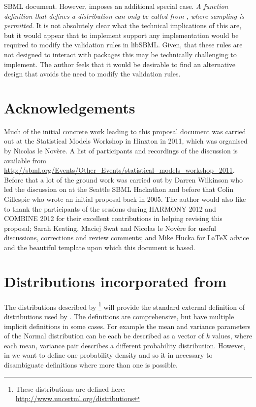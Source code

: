 \documentclass[draftspec]{sbmlpkgspec}
\begin{document}
\begin{description}
  SBML document. However, \distribshort imposes an additional special
  case. \emph{A function definition that defines a distribution can
    only be called from \mathml, where sampling is permitted.} It is
  not absolutely clear what the technical implications of this are,
  but it would appear that to implement \distribshort support any
  implementation would be required to modify the \mathml validation
  rules in libSBML. Given, that these rules are not designed to
  interact with packages this may be technically challenging to
  implement. The author feels that it would be desirable to find an
  alternative design that avoids the need to modify the \mathml
  validation rules.
\end{description}

\section{Acknowledgements}
\label{sec:uncertmlusage}

Much of the initial concrete work leading to this proposal document
was carried out at the Statistical Models Workshop in Hinxton in 2011,
which was organised by Nicolas le Nov\`{e}re. A list of participants
and recordings of the discussion is available from
\url{http://sbml.org/Events/Other_Events/statistical_models_workshop_2011}.
Before that a lot of the ground work was carried out by Darren
Wilkinson who led the discussion on \distribshort at the Seattle SBML
Hackathon and before that Colin Gillespie who wrote an initial
proposal back in 2005. The author would also like to thank the
participants of the \distribshort sessions during HARMONY 2012 and
COMBINE 2012 for their excellent contributions in helping revising
this proposal; Sarah Keating, Maciej Swat and Nicolas le Nov\`{e}re
for useful discussions, corrections and review comments; and Mike
Hucka for \LaTeX{} advice and the beautiful template upon which this
document is based.

\appendix
\section{Distributions incorporated from \uncertml}

The distributions described by \uncertml \footnote{These
  distributions are defined here:
  \url{http://www.uncertml.org/distributions}} will provide the
standard external definition of distributions used by \distrib. The
definitions are comprehensive, but have multiple implicit definitions
in some cases. For example the mean and variance parameters of the
Normal distribution can be each be described as a vector of $k$
values, where each mean, variance pair describes a different
probability distribution. However, in \distribshort we want to define
one probability density and so it in necessary to disambiguate
definitions where more than one is possible.
\end{document}
